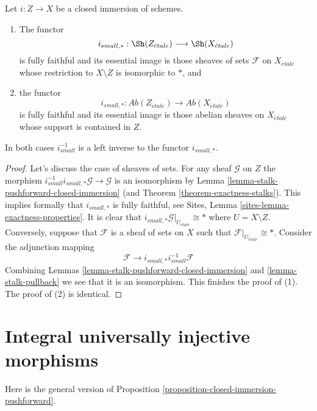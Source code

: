\begin{proposition}
\label{proposition-closed-immersion-pushforward}
Let $i : Z \to X$ be a closed immersion of schemes.
\begin{enumerate}
\item The functor
$$
i_{small, *} :
\Sh(Z_{\acute{e}tale})
\longrightarrow
\Sh(X_{\acute{e}tale})
$$
is fully faithful and its essential image is those sheaves of sets
$\mathcal{F}$ on $X_{\acute{e}tale}$ whose restriction to $X \setminus Z$ is
isomorphic to $*$, and
\item the functor
$$
i_{small, *} :
\textit{Ab}(Z_{\acute{e}tale})
\longrightarrow
\textit{Ab}(X_{\acute{e}tale})
$$
is fully faithful and its essential image is those abelian sheaves on
$X_{\acute{e}tale}$ whose support is contained in $Z$.
\end{enumerate}
In both cases $i_{small}^{-1}$ is a left inverse to the functor
$i_{small, *}$.
\end{proposition}

\begin{proof}
Let's discuss the case of sheaves of sets.
For any sheaf $\mathcal{G}$ on $Z$ the morphism
$i_{small}^{-1}i_{small, *}\mathcal{G} \to \mathcal{G}$
is an isomorphism by
Lemma \ref{lemma-stalk-pushforward-closed-immersion}
(and
Theorem \ref{theorem-exactness-stalks}).
This implies formally that $i_{small, *}$ is fully faithful, see
Sites, Lemma \ref{sites-lemma-exactness-properties}.
It is clear that $i_{small, *}\mathcal{G}|_{U_{\acute{e}tale}} \cong *$
where $U = X \setminus Z$. Conversely, suppose that $\mathcal{F}$
is a sheaf of sets on $X$ such that $\mathcal{F}|_{U_{\acute{e}tale}} \cong *$.
Consider the adjunction mapping
$$
\mathcal{F} \longrightarrow i_{small, *}i_{small}^{-1}\mathcal{F}
$$
Combining
Lemmas \ref{lemma-stalk-pushforward-closed-immersion} and
\ref{lemma-stalk-pullback}
we see that it is an isomorphism. This finishes the proof of (1).
The proof of (2) is identical.
\end{proof}





\section{Integral universally injective morphisms}
\label{section-integral-universally-injective}

\noindent
Here is the general version of
Proposition \ref{proposition-closed-immersion-pushforward}.

